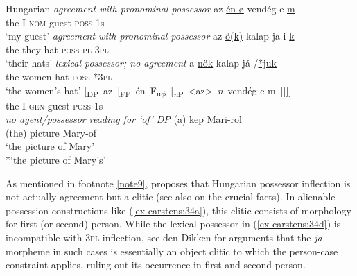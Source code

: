 \documentclass[output=paper
,modfonts
,nonflat]{langsci/langscibook}
\begin{document}
\begin{exe}
	\ex Hungarian \citep[90]{Szabolcsi1983} \label{ex-carstens:34}
	\xlist
	\ex\label{ex-carstens:34a} \textit{agreement with pronominal possessor} \newline
	\gll az   \uline{én-ø} vendég-e-\uline{m}\\
	the I-\textsc{nom} guest-\textsc{poss}{}-1s\\
	\glt `my guest'  	
	\ex \textit{agreement with pronominal possessor} \newline
	\gll az   \uline{\H{o}(k)}  kalap-ja-i-\uline{k}\\
	the they hat-\textsc{poss}{}-\textsc{pl}{}-\textsc{3pl}\\
	\glt `their hats'
	\ex \textit{lexical possessor; no agreement}\newline
	\gll  a   \uline{n\H{o}k}       kalap-já-/\uline{*juk}\\
	the   women hat-\textsc{poss}{}-*\textsc{3pl}\\
	\glt `the women's hat' 
	\ex \label{ex-carstens:34d}
	\gll \mbox{[\textsubscript{DP} az [\textsubscript{FP} én    F\textsubscript{u}\textsubscript{$\phi$} [\textsubscript{\textit{n}P} <az> \textit{n} vendég-e-m ]]]]}\\
	\hspace{0.6cm}the      \hspace{-5.4cm}I-\textsc{gen}                     \hspace{-2.7cm}guest-\textsc{poss}-1s\\
	\ex \textit{no agent/possessor reading for `of' DP} \newline
	\gll (a) kep       Mari-rol\\
	(the) picture Mary-of\\
	\glt `the picture of Mary'\\ {*}`the picture of Mary's'
	\endxlist
\end{exe}
As mentioned in footnote \ref{note9}, \citet{Den_Dikken2015} proposes that Hungarian possessor inflection is not actually agreement but a clitic (see also \citealt{Bartos1999,Den_Dikken1999,Kiss2002} on the crucial facts). In alienable possession constructions like (\ref{ex-carstens:34a}), this clitic consists of morphology for first (or second) person. While the lexical possessor in (\ref{ex-carstens:34d}) is incompatible with \textsc{3pl} inflection, see den Dikken for arguments that the \textit{ja} morpheme in such cases is essentially an object clitic to which the person-case constraint applies, ruling out its occurrence in first and second person.\largerpage
\end{document}
